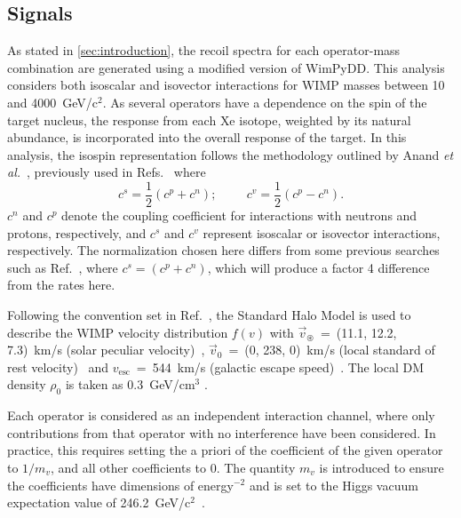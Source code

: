 \documentclass[reprint, showpacs,
preprintnumbers,
amsmath,amssymb,
aps, floatfix,
superscriptaddress,
prd, nofootinbib]{revtex4-1}
\begin{document}
\subsection{\label{subsec:signal}Signals}
\par
As stated in \autoref{sec:introduction}, the recoil spectra for each operator-mass combination are generated using a modified version of WimPyDD. 
This analysis considers both isoscalar and isovector interactions for WIMP masses between 10 and 4000~GeV/c$^2$.
As several operators have a dependence on the spin of the target nucleus, the response from each Xe isotope, weighted by its natural abundance, is incorporated into the overall response of the target.  
In this analysis, the isospin representation follows the methodology outlined by Anand \textit{et al.}~\cite{Anand:MathematicaEFT}, previously used in Refs.~\cite{PandaX2:SD_EFT_2019, Xenon100:EFT_2017} where
\begin{equation}
    c^{s} = \frac{1}{2} (c^{p} + c^{n}); \hspace{1cm} c^v = \frac{1}{2}(c^p - c^n).
\end{equation}
$c^n$ and $c^p$ denote the coupling coefficient for interactions with neutrons and protons, respectively, and $c^s$ and $c^v$ represent isoscalar or isovector interactions, respectively.
The normalization chosen here differs from some previous searches such as Ref.~\cite{LUX:EFTR4_2021}, where $c^{s} = (c^p + c^n)$, which will produce a factor 4 difference from the rates here.
\par
Following the convention set in Ref.~\cite{DM_parameters:BAXTER2021_Conventions}, the Standard Halo Model is used to describe the WIMP velocity distribution $f(v)$ with $\vec{v}_\circledast$~=~(11.1, 12.2, 7.3)~km/s (solar peculiar velocity)~\cite{Schoenrich:Local_kinematics}, $\vec{v}_0$~=~(0, 238, 0)~km/s (local standard of rest velocity)~\cite{DM_parameters:galaxy_context_rest_velocity_1, DM_parameters:galaxy_context_rest_velocity_2} and $v_{\text{esc}}$~=~544~km/s (galactic escape speed)~\cite{DM_parameters:RAVE_survey_escape_velocity}. 
The local DM density $\rho_0$ is taken as 0.3~GeV/cm$^3$ \cite{DM_parameters:LEWIN199687_DM_density}. 
\par
Each operator is considered as an independent interaction channel, where only contributions from that operator with no interference have been considered. 
In practice, this requires setting the a priori of the coefficient of the given operator to $1/m_v$, and all other coefficients to 0. 
The quantity $m_v$ is introduced to ensure the coefficients have dimensions of energy$^{-2}$ and is set to the Higgs vacuum expectation value of 246.2~GeV/c$^2$~\cite{Fitzpatrick:EFT}. 
\end{document}
